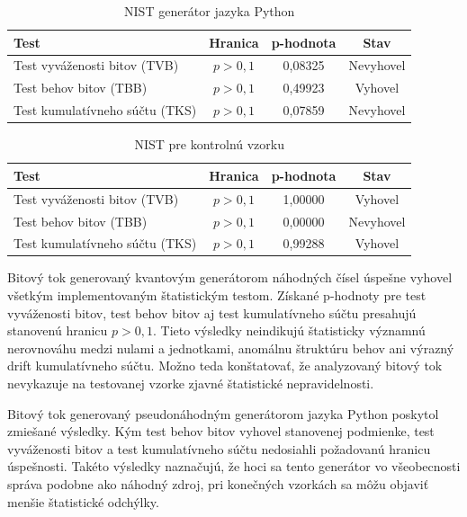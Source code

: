 \begin{table}[H]
  \centering
  \caption{NIST generátor jazyka Python}
  \label{tab:nist_prng}
  \begin{tabular}{lccc}
    \toprule
    \textbf{Test} & \textbf{Hranica} & \textbf{p-hodnota} & \textbf{Stav} \\
    \midrule
    Test vyváženosti bitov (TVB)   & $p > 0{,}1$ & 0,08325 & Nevyhovel \\
    Test behov bitov (TBB)         & $p > 0{,}1$ & 0,49923 & Vyhovel \\
    Test kumulatívneho súčtu (TKS) & $p > 0{,}1$ & 0,07859 & Nevyhovel \\
    \bottomrule
  \end{tabular}

\end{table}

\begin{table}[H]
  \centering
  \caption{NIST pre kontrolnú vzorku}
  \label{tab:nist_lcg}
  \begin{tabular}{lccc}
    \toprule
    \textbf{Test} & \textbf{Hranica} & \textbf{p-hodnota} & \textbf{Stav} \\
    \midrule
    Test vyváženosti bitov (TVB)   & $p > 0{,}1$ & 1,00000 & Vyhovel \\
    Test behov bitov (TBB)         & $p > 0{,}1$ & 0,00000 & Nevyhovel \\
    Test kumulatívneho súčtu (TKS) & $p > 0{,}1$ & 0,99288 & Vyhovel \\
    \bottomrule
  \end{tabular}

\end{table}

Bitový tok generovaný kvantovým generátorom náhodných čísel úspešne vyhovel všetkým implementovaným štatistickým testom.
Získané p-hodnoty pre test vyváženosti bitov, test behov bitov aj test kumulatívneho súčtu presahujú stanovenú hranicu $p>0{,}1$.
Tieto výsledky neindikujú štatisticky významnú nerovnováhu medzi nulami a jednotkami, anomálnu štruktúru behov ani výrazný drift kumulatívneho súčtu.
Možno teda konštatovať, že analyzovaný bitový tok nevykazuje na testovanej vzorke zjavné štatistické nepravidelnosti.

Bitový tok generovaný pseudonáhodným generátorom jazyka Python poskytol zmiešané výsledky.
Kým test behov bitov vyhovel stanovenej podmienke, test vyváženosti bitov a test kumulatívneho súčtu nedosiahli požadovanú hranicu úspešnosti.
Takéto výsledky naznačujú, že hoci sa tento generátor vo všeobecnosti správa podobne ako náhodný zdroj, pri konečných vzorkách sa môžu objaviť menšie štatistické odchýlky.

